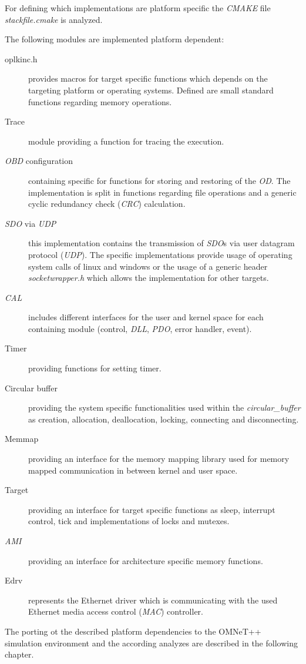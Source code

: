 For defining which implementations are platform specific the \emph{CMAKE} file \emph{stackfile.cmake} is analyzed.

The following modules are implemented platform dependent:

\begin{description}
    \item[oplkinc.h] provides macros for target specific functions which depends on the targeting platform or operating systems.
    Defined are small standard functions regarding memory operations.
    \item[Trace] module providing a function for tracing the execution.
    \item[\emph{OBD} configuration] containing specific for functions for storing and restoring of the \emph{OD}.
    The implementation is split in functions regarding file operations and a generic cyclic redundancy check (\emph{CRC}) calculation.
    \item[\emph{SDO} via \emph{UDP}] this implementation contains the transmission of \emph{SDO}s via user datagram protocol (\emph{UDP}).
    The specific implementations provide usage of operating system calls of linux and windows or the usage of a generic header \emph{socketwrapper.h} which allows the implementation for other targets.
    \item[\emph{CAL}] includes different interfaces for the user and kernel space for each containing module (control, \emph{DLL}, \emph{PDO}, error handler, event).
    \item[Timer] providing functions for setting timer.
    \item[Circular buffer] providing the system specific functionalities used within the \emph{circular\_buffer} as creation, allocation, deallocation, locking, connecting and disconnecting.
    \item[Memmap] providing an interface for the memory mapping library used for memory mapped communication in between kernel and user space.
    \item[Target] providing an interface for target specific functions as sleep, interrupt control, tick and implementations of locks and mutexes.
    \item[\emph{AMI}] providing an interface for architecture specific memory functions.
    \item[Edrv] represents the Ethernet driver which is communicating with the used Ethernet media access control (\emph{MAC}) controller.
\end{description}

The porting ot the described platform dependencies to the OMNeT++ simulation environment and the according analyzes are described in the following chapter.